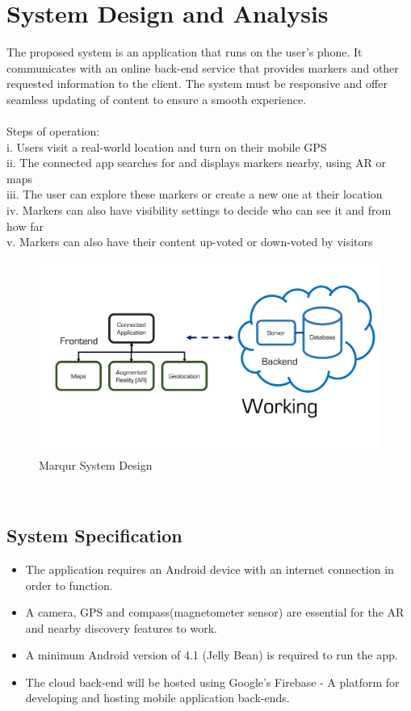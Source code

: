 \chapter{System Design and Analysis}
The proposed system is an application that runs on the user's phone. It communicates with an online back-end service that provides markers and other requested information to the client. The system must be responsive and offer seamless updating of content to ensure a smooth experience.\\\\
Steps of operation:\\
i.	Users visit a real-world location and turn on their mobile GPS\\
ii.	The connected app searches for and displays markers nearby, using AR or maps\\
iii.	The user can explore these markers or create a new one at their location\\
iv.	Markers can also have visibility settings to decide who can see it and from how far\\
v.	Markers can also have their content up-voted or down-voted by visitors\\
\begin{figure}[h]
\center
\includegraphics[scale=1.0]{sys_design.png}   
\caption{Marqur System Design }
\label{fig1}
\end{figure}
\pagebreak\\
\section{System Specification}
\begin{itemize}
\item The application requires an Android device with an internet connection in order to function.
\item A camera, GPS and compass(magnetometer sensor) are essential for the AR and nearby discovery features to work.
\item A minimum Android version of 4.1 (Jelly Bean) is required to run the app.
\item The cloud back-end will be hosted using Google's Firebase - A platform for developing and hosting mobile application back-ends.
\end{itemize}
  

